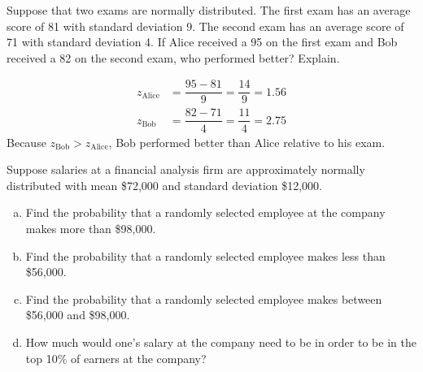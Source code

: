 \documentclass[11pt,letterpaper]{article}
\begin{document}

 Suppose that two exams are normally distributed. The first exam has an average score of 81 with standard deviation 9. The second exam has an average score of 71 with standard deviation 4. If Alice received a 95 on the first exam and Bob received a 82 on the second exam, who performed better? Explain. \pspace

\sol
	\[
	\begin{aligned}
	z_{\text{Alice}}&= \dfrac{95 - 81}{9}= \dfrac{14}{9}= 1.56 \\
	z_{\text{Bob}}&= \dfrac{82 - 71}{4}= \dfrac{11}{4}= 2.75
	\end{aligned}
	\]
Because $z_{\text{Bob}} > z_{\text{Alice}}$, Bob performed better than Alice relative to his exam. 





\newpage





 Suppose salaries at a financial analysis firm are approximately normally distributed with mean \$72,000 and standard deviation \$12,000. 
        \begin{enumerate}[(a)]
        \item Find the probability that a randomly selected employee at the company makes more than \$98,000.
        \item Find the probability that a randomly selected employee makes less than \$56,000.
        \item Find the probability that a randomly selected employee makes between \$56,000 and \$98,000.
        \item How much would one's salary at the company need to be in order to be in the top 10\% of earners at the company?
        \end{enumerate} \pspace
\end{document}
